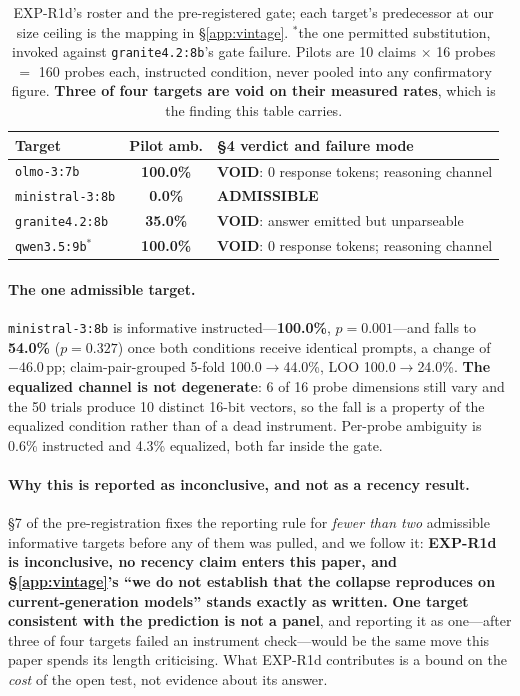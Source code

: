 \begin{table}[h]
\centering
\small
\begin{tabular}{@{}lcl@{}}
\toprule
\textbf{Target} & \textbf{Pilot amb.} & \textbf{§4 verdict and failure mode} \\
\midrule
\texttt{olmo-3:7b}         & \textbf{100.0\%}          & \textbf{VOID}: 0 response tokens; reasoning channel \\
\texttt{ministral-3:8b}    & \phantom{0}\textbf{0.0\%} & \textbf{ADMISSIBLE} \\
\texttt{granite4.2:8b}     & \phantom{0}\textbf{35.0\%} & \textbf{VOID}: answer emitted but unparseable \\
\texttt{qwen3.5:9b}$^\ast$ & \textbf{100.0\%}          & \textbf{VOID}: 0 response tokens; reasoning channel \\
\bottomrule
\end{tabular}
\caption{EXP-R1d's roster and the pre-registered gate; each target's predecessor at our size ceiling is the mapping in §\ref{app:vintage}. $^\ast$the one permitted substitution, invoked against \texttt{granite4.2:8b}'s gate failure. Pilots are 10 claims $\times$ 16 probes $=$ 160 probes each, instructed condition, never pooled into any confirmatory figure. \textbf{Three of four targets are void on their measured rates}, which is the finding this table carries.}
\label{tab:r1d}
\end{table}

\paragraph{The one admissible target.} \texttt{ministral-3:8b} is informative instructed---\textbf{100.0\%}, $p=0.001$---and falls to \textbf{54.0\%} ($p=0.327$) once both conditions receive identical prompts, a change of $-46.0$\,pp; claim-pair-grouped 5-fold 100.0$\to$44.0\%, LOO 100.0$\to$24.0\%. \textbf{The equalized channel is not degenerate}: 6 of 16 probe dimensions still vary and the 50 trials produce 10 distinct 16-bit vectors, so the fall is a property of the equalized condition rather than of a dead instrument. Per-probe ambiguity is 0.6\% instructed and 4.3\% equalized, both far inside the gate.

\paragraph{Why this is reported as inconclusive, and not as a recency result.} §7 of the pre-registration fixes the reporting rule for \emph{fewer than two} admissible informative targets before any of them was pulled, and we follow it: \textbf{EXP-R1d is inconclusive, no recency claim enters this paper, and §\ref{app:vintage}'s ``we do not establish that the collapse reproduces on current-generation models'' stands exactly as written.} \textbf{One target consistent with the prediction is not a panel}, and reporting it as one---after three of four targets failed an instrument check---would be the same move this paper spends its length criticising. What EXP-R1d contributes is a bound on the \emph{cost} of the open test, not evidence about its answer.

